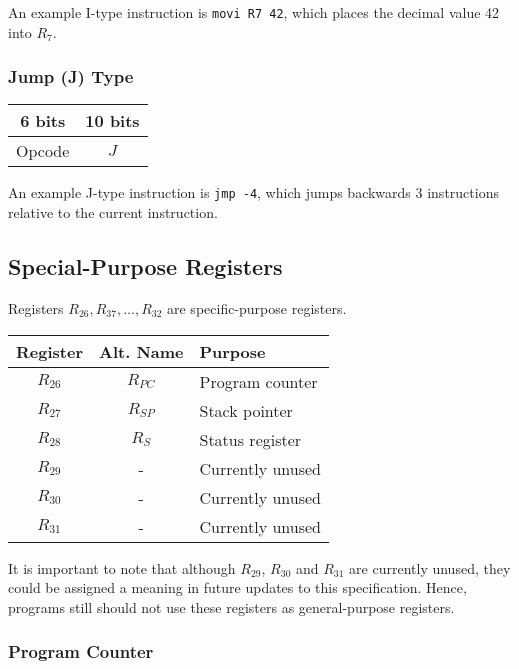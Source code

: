 \documentclass[12pt]{scrartcl}
\begin{document}
An example I-type instruction is \texttt{movi R7 42}, which places the decimal value 42 into $R_7$.


\subsubsection{Jump (J) Type}

\begin{center}
  \begin{tabular}{|c|c|}
    \hline
    \textbf{6 bits} & \textbf{10 bits} \\
    \hline
    Opcode & $J$ \\
    \hline
  \end{tabular}
\end{center}

An example J-type instruction is \texttt{jmp -4}, which jumps backwards 3 instructions relative to the current instruction.

\subsection{Special-Purpose Registers}

Registers $R_{26}, R_{37}, \ldots, R_{32}$ are specific-purpose registers.

\begin{center}
  \begin{tabular}{c c l}
    \textbf{Register} & \textbf{Alt. Name} & \textbf{Purpose} \\
    \hline \hline
    $R_{26}$ & $R_{PC}$ & Program counter \\
    $R_{27}$ & $R_{SP}$ & Stack pointer \\
    $R_{28}$ & $R_{S}$  & Status register \\
    $R_{29}$ & -        & Currently unused \\
    $R_{30}$ & -        & Currently unused \\
    $R_{31}$ & -        & Currently unused \\
  \end{tabular}
\end{center}

It is important to note that although $R_{29}$, $R_{30}$ and $R_{31}$ are currently unused, they could be assigned a meaning in future updates to this specification. Hence, programs still should not use these registers as general-purpose registers.


\subsubsection{Program Counter}
\end{document}
